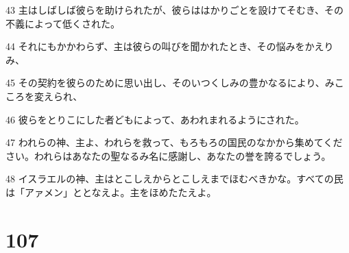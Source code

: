 \par 43 主はしばしば彼らを助けられたが、彼らははかりごとを設けてそむき、その不義によって低くされた。
\par 44 それにもかかわらず、主は彼らの叫びを聞かれたとき、その悩みをかえりみ、
\par 45 その契約を彼らのために思い出し、そのいつくしみの豊かなるにより、みこころを変えられ、
\par 46 彼らをとりこにした者どもによって、あわれまれるようにされた。
\par 47 われらの神、主よ、われらを救って、もろもろの国民のなかから集めてください。われらはあなたの聖なるみ名に感謝し、あなたの誉を誇るでしょう。
\par 48 イスラエルの神、主はとこしえからとこしえまでほむべきかな。すべての民は「アァメン」ととなえよ。主をほめたたえよ。

\chapter{107}

